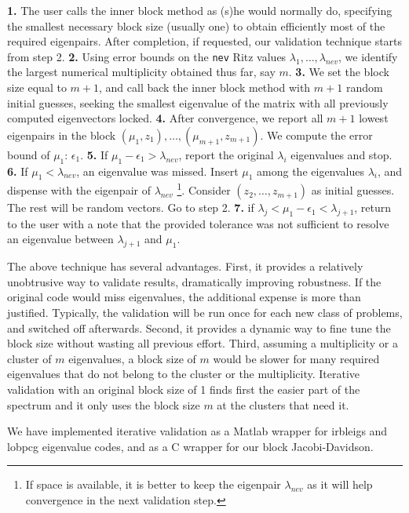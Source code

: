 \documentclass{report}
\begin{document}
{\bf 1.}
The user calls the inner block method as (s)he would normally do,
specifying the smallest necessary block size (usually one) to obtain
efficiently most of the required eigenpairs.
After completion, if requested,
our validation technique starts from step 2.
{\bf 2.}
Using error bounds on the {\tt nev} Ritz values
$\lambda_1, \ldots , \lambda_{nev}$, we identify the largest
numerical multiplicity obtained thus far, say $m$.
{\bf 3.}
We set the block size equal to $m+1$, and call back the inner
block method with $m+1$ random initial guesses,
seeking the smallest eigenvalue of the matrix with
all previously computed eigenvectors locked.
{\bf 4.}
After convergence, we report all $m+1$ lowest eigenpairs in the block
$(\mu_1, z_1), \ldots , (\mu_{m+1}, z_{m+1})$.
We compute the error bound of $\mu_1$: $\epsilon_1$.
{\bf 5.}
If $\mu_1 - \epsilon_1 > \lambda_{nev}$, report the original $\lambda_i$
eigenvalues and stop.
{\bf 6.}
If $\mu_1 < \lambda_{nev}$, an eigenvalue was missed.
Insert $\mu_1$ among the eigenvalues $\lambda_i$,
and dispense with the eigenpair of $\lambda_{nev}$
\footnote{If space is available, it is better to keep the
eigenpair $\lambda_{nev}$ as it will help convergence in the
next validation step.}.
Consider $(z_2, \ldots , z_{m+1})$ as initial guesses. The rest
will be random vectors.
Go to step 2.
{\bf 7.}
if $\lambda_j < \mu_1 - \epsilon_1 < \lambda_{j+1}$, return to the
user with a note that the provided tolerance
was not sufficient to resolve an eigenvalue between $\lambda_{j+1}$
and $\mu_1$.

The above technique has several advantages.
First, it provides a relatively unobtrusive way to
validate results, dramatically improving robustness.
If the original code would miss eigenvalues,
the additional expense is more than justified.
Typically, the validation will be run once for each new class of
problems, and switched off afterwards.
Second, it provides a dynamic way to fine tune the block size without
wasting all previous effort.
Third, assuming a multiplicity or a cluster of $m$ eigenvalues,
a block size of $m$ would be slower for many
required eigenvalues that do not belong to the cluster or
the multiplicity.
Iterative validation with an original block size of 1 finds first
the easier part of the spectrum and it only uses the block size
$m$ at the clusters that need it.

We have implemented iterative validation as a Matlab wrapper for
\mbox{irbleigs} and \mbox{lobpcg} eigenvalue codes, and as a C
wrapper for our block Jacobi-Davidson.
\end{document}
